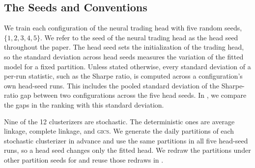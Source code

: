 \subsection{The Seeds and Conventions}
\label{sec:seeds}

We train each configuration of the neural trading head with five random seeds, $\{1, 2, 3, 4, 5\}$. We refer to the seed of the neural trading head as the head seed throughout the paper. The head seed sets the initialization of the trading head, so the standard deviation across head seeds measures the variation of the fitted model for a fixed partition. Unless stated otherwise, every standard deviation of a per-run statistic, such as the Sharpe ratio, is computed across a configuration's own head-seed runs. This includes the pooled standard deviation of the Sharpe-ratio gap between two configurations across the five head seeds. In , we compare the gaps in the ranking with this standard deviation.

Nine of the 12 clusterizers are stochastic. The deterministic ones are average linkage, complete linkage, and \textsc{gics}. We generate the daily partitions of each stochastic clusterizer in advance and use the same partitions in all five head-seed runs, so a head seed changes only the fitted head. We redraw the partitions under other partition seeds for  and reuse those redraws in .

